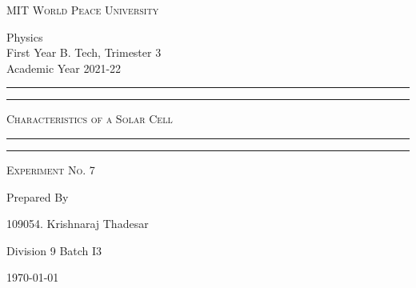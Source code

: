 \documentclass[12pt]{article}
\begin{document}
	
	\begin{titlepage} 
		\centering 
		
		
		\huge\textsc{
			MIT World Peace University
		}\\
	
		\vspace{0.75\baselineskip} %
		
		\LARGE{
			Physics\\
			First Year B. Tech, Trimester 3\\
			Academic Year 2021-22
		}
		
		\vfill %
		
		
		\rule{\textwidth}{1.6pt}\vspace*{-\baselineskip}\vspace*{2pt}
		\rule{\textwidth}{0.6pt}
		\vspace{0.75\baselineskip} %
		
		
		
		\huge{\textsc{
				Characteristics of a Solar Cell
			}} \\
		
		
		
		\vspace{0.5\baselineskip} %
		\rule{\textwidth}{0.6pt}\vspace*{-\baselineskip}\vspace*{2.8pt}
		\rule{\textwidth}{1.6pt}
		
		\vspace{1\baselineskip} %

			
		\LARGE\textsc{
			Experiment No. 7
		} %
		\vfill
		
		
		Prepared By
		\vspace{0.5\baselineskip} %
		
		\Large{
			109054. Krishnaraj Thadesar
			
			Division 9 Batch I3
		}
		
		
		\vspace{0.5\baselineskip} %
		\today

	\end{titlepage}
\end{document}
